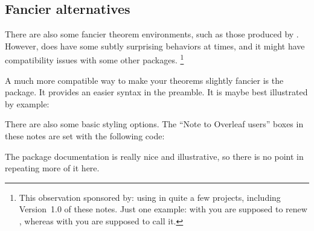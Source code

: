 %
%
\subsection{Fancier alternatives}

There are also some fancier theorem environments,
such as those produced by .
However,  does have some subtly surprising behaviors at times,
and it might have compatibility issues with some other packages.%
\footnote{This observation sponsored by: using  in quite a few projects,
including Version~1.0 of these notes.
Just one example: with  you are supposed to renew ,
whereas with  you are supposed to call it.}

A much more compatible way to make your theorems slightly fancier is the  package.
It provides an easier syntax in the preamble.
It is maybe best illustrated by example:
%
\begin{ExampleCode}
\usepackage{thmtools}

\end{ExampleCode}

There are also some basic styling options.
The ``Note to Overleaf users'' boxes in these notes are set with the following code:
\begin{ExampleCode}
\end{ExampleCode}

The package documentation is really nice and illustrative,
so there is no point in repeating more of it here.
